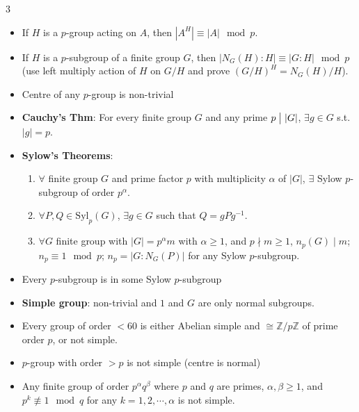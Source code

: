 \documentclass[10pt]{article}
\newcommand{\Z}{\mathbb{Z}} %
\newcommand{\abs}[1]{\left\lvert#1\right\rvert} %
\begin{document}
\begin{multicols*}{3}
\begin{itemize}
            \item If $H$ is a $p$-group acting on $A$, then $\abs{A^H} \equiv \abs{A} \mod p$.
            \item If $H$ is a $p$-subgroup of a finite group $G$, then $\abs{N_G\left(H\right) \colon H} \equiv \abs{G \colon H} \mod p$ (use left multiply action of $H$ on $G \slash H$ and prove $\left(G \slash H\right)^H = N_G\left(H\right) \slash H$).
            \item Centre of any $p$-group is non-trivial
            \item \textbf{Cauchy's Thm}: For every finite group $G$ and any prime $p \bigm\vert \abs{G}$, $\exists g \in G$ s.t. $\abs{g} = p$.
            \item \textbf{Sylow's Theorems}:
            \begin{enumerate}
                \item $\forall$ finite group $G$ and prime factor $p$ with multiplicity $\alpha$ of $\abs{G}$, $\exists$ Sylow $p$-subgroup of order $p^{\alpha}$.
                \item $\forall P, Q \in \mathrm{Syl}_p\left(G\right)$, $\exists g \in G$ such that $Q = gPg^{-1}$.
                \item $\forall G$ finite group with $\abs{G} = p^{\alpha}m$ with $\alpha \geq 1$, and $p \nmid m \geq 1$, $n_p\left(G\right) \mid m$; $n_p \equiv 1 \mod p$; $n_p = \abs{G \colon N_G\left(P\right)}$ for any Sylow $p$-subgroup.
            \end{enumerate}
            \item Every $p$-subgroup is in some Sylow $p$-subgroup
            \item \textbf{Simple group}: non-trivial and $1$ and $G$ are only normal subgroups.
            \item Every group of order $< 60$ is either Abelian simple and $\cong \Z \slash p\Z$ of prime order $p$, or not simple.
            \item $p$-group with order $> p$ is not simple (centre is normal)
            \item Any finite group of order $p^{\alpha}q^{\beta}$ where $p$ and $q$ are primes, $\alpha, \beta \geq 1$, and $p^k \not\equiv 1 \mod q$ for any $k = 1, 2, \cdots, \alpha$ is not simple.
        \end{itemize}
    \end{multicols*}
\end{document}

